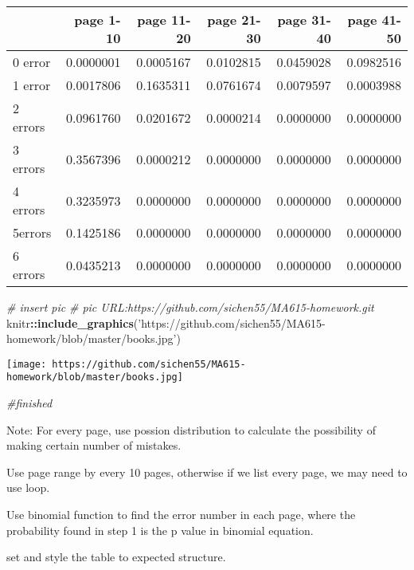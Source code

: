 \documentclass[]{article}
\newenvironment{Shaded}{\begin{snugshade}}{\end{snugshade}}
\newcommand{\KeywordTok}[1]{\textcolor[rgb]{0.13,0.29,0.53}{\textbf{#1}}}
\newcommand{\StringTok}[1]{\textcolor[rgb]{0.31,0.60,0.02}{#1}}
\newcommand{\CommentTok}[1]{\textcolor[rgb]{0.56,0.35,0.01}{\textit{#1}}}
\newcommand{\OperatorTok}[1]{\textcolor[rgb]{0.81,0.36,0.00}{\textbf{#1}}}
\newcommand{\NormalTok}[1]{#1}
\begin{document}
\begin{table}[H]
\centering\begingroup\fontsize{16}{18}\selectfont

\begin{tabular}{l|r|r|r|r|r}
\hline
  & page 1-10 & page 11-20 & page 21-30 & page 31-40 & page 41-50\\
\hline
0 error & 0.0000001 & 0.0005167 & 0.0102815 & 0.0459028 & 0.0982516\\
\hline
1 error & 0.0017806 & 0.1635311 & 0.0761674 & 0.0079597 & 0.0003988\\
\hline
2 errors & 0.0961760 & 0.0201672 & 0.0000214 & 0.0000000 & 0.0000000\\
\hline
3 errors & 0.3567396 & 0.0000212 & 0.0000000 & 0.0000000 & 0.0000000\\
\hline
4 errors & 0.3235973 & 0.0000000 & 0.0000000 & 0.0000000 & 0.0000000\\
\hline
5errors & 0.1425186 & 0.0000000 & 0.0000000 & 0.0000000 & 0.0000000\\
\hline
6 errors & 0.0435213 & 0.0000000 & 0.0000000 & 0.0000000 & 0.0000000\\
\hline
\end{tabular}\endgroup{}
\end{table}

\begin{Shaded}
\begin{Highlighting}[]
\CommentTok{# insert pic}
\CommentTok{# pic URL:https://github.com/sichen55/MA615-homework.git}
\NormalTok{knitr}\OperatorTok{::}\KeywordTok{include_graphics}\NormalTok{(}\StringTok{'https://github.com/sichen55/MA615-homework/blob/master/books.jpg'}\NormalTok{)}
\end{Highlighting}
\end{Shaded}

\texttt{[image: https://github.com/sichen55/MA615-homework/blob/master/books.jpg]}

\begin{Shaded}
\begin{Highlighting}[]
\CommentTok{#finished}
\end{Highlighting}
\end{Shaded}

Note: For every page, use possion distribution to calculate the
possibility of making certain number of mistakes.

Use page range by every 10 pages, otherwise if we list every page, we
may need to use loop.

Use binomial function to find the error number in each page, where the
probability found in step 1 is the p value in binomial equation.

set and style the table to expected structure.
\end{document}
